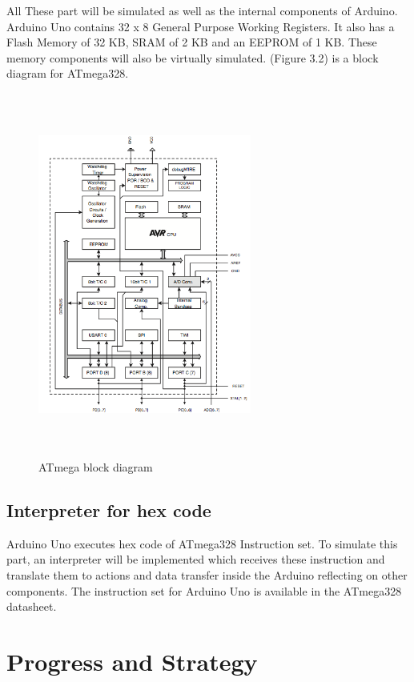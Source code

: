 \documentclass[12pt, a4paper]{report}
\begin{document}
\newpage

All These part will be simulated as well as the internal components of Arduino. Arduino Uno contains 32 x 8 General Purpose Working Registers. It also has a Flash Memory of 32 KB, SRAM of 2 KB and an EEPROM of 1 KB. These memory components will also be virtually simulated. (Figure 3.2) is a block diagram for ATmega328.

\begin{figure}[h!]
\centering
\includegraphics[height=12cm, width=7cm]{ArduinoBlockDiagram.png}
\caption{ATmega block diagram \protect\cite{BlockDiagram}}
\label{Arduino Uno block diagram}
\end{figure}

\newpage

\section{Interpreter for hex code}
Arduino Uno executes hex code of ATmega328 Instruction set. To simulate this part, an interpreter will be implemented which receives these instruction and translate them to actions and data transfer inside the Arduino reflecting on other components. The instruction set for Arduino Uno is available in the ATmega328 datasheet.

\newpage

\chapter{Progress and Strategy}
\end{document}
